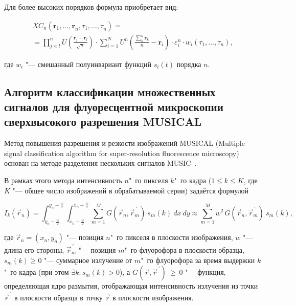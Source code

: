 Для более высоких порядков формула приобретает вид:	

\begin{equation*}
	\begin{multlined}
		{XC}_n\left(\mathbf{r}_1,{\ldots,\mathbf{r}}_n,\tau_1,{\ldots,\tau}_n \right) = \\
		= \prod_{j<l}^{n}{U\left(\frac{\mathbf{r}_j-\mathbf{r}_l}{\sqrt n}\right)} \cdot \sum_{i=1}^{N}{U^n\left(\frac{\sum_{k}^{n}\mathbf{r}_k}{n}-\mathbf{r}_i \right)\cdot\varepsilon_i^n\cdot w_i(\tau_1,\ldots,\tau_n)},
	\end{multlined}
\end{equation*}

\noindent где $w_i$ "--- смешанный полуинвариант функций $s_i(t)$ порядка $n$.

\subsection{Алгоритм классификации множественных сигналов для флуоресцентной микроскопии сверхвысокого разрешения MUSICAL}

Метод повышения разрешения и резкости изображений MUSICAL (Multiple signal classification algorithm for super-resolution fluorescence microscopy)~\cite{agarwal2016multiple} основан на методе разделения нескольких сигналов MUSIC~\cite{schmidt1986multiple}.

В рамках этого метода интенсивность $n$"~го пикселя $k$"~го кадра ($1\le k\le K$, где $K$ "--- общее число изображений в обрабатываемой серии) задаётся формулой

\begin{equation}
	I_k\left({\vec{r}}_n\right)=\int_{y_n-\frac{w}{2}}^{y_n+\frac{w}{2}}\int_{x_n-\frac{w}{2}}^{x_n+\frac{w}{2}}\sum_{m=1}^{M}{G\left({\vec{r}}_n,{\vec{r}}_m^{\,\prime}\right)\ s_m\left(k\right)\ dx\ dy}\approx\sum_{m=1}^{M}{w^{2\ }G\left({\vec{r}}_n,{\vec{r}}_m^{\,\prime}\right){\ s}_m\left(k\right)}, \nonumber
\end{equation}	

\noindent где ${\vec{r}}_n=(x_n,y_n)$ "--- позиция $n$"~го пикселя в плоскости изображения, $w$ "--- длина его стороны, ${\vec{r}}_m^{\,\prime}$ "--- позиция $m$"~го флуорофора в плоскости образца, $s_m\left(k\right)\geq0$ "--- суммарное излучение от $m$"~го флуорофора за время выдержки $k$"~го кадра (при этом $\exists k: {s}_m\left(k\right)>0$), а $G\left(\vec{r},{\vec{r}}^{\,\prime}\right)\ \geq\ 0$ "--- функция, определяющая ядро размытия, отображающая интенсивность излучения из точки ${\vec{r}}^{\,\prime}$ в плоскости образца в точку $\vec{r}$ в плоскости изображения.


